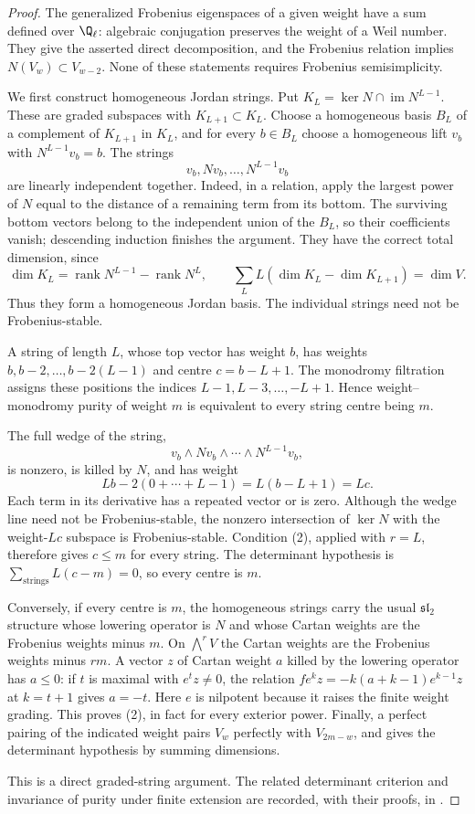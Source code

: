 \begin{proof}
The generalized Frobenius eigenspaces of a given weight have a
sum defined over $\Q_\ell$: algebraic conjugation preserves the
weight of a Weil number.  They give the asserted direct
decomposition, and the Frobenius relation implies
$N(V_w)\subset V_{w-2}$.  None of these statements requires
Frobenius semisimplicity.

We first construct homogeneous Jordan strings.  Put
$K_L=\ker N\cap\operatorname{im}N^{L-1}$.  These are graded
subspaces with $K_{L+1}\subset K_L$.  Choose a homogeneous basis
$B_L$ of a complement of $K_{L+1}$ in $K_L$, and for every
$b\in B_L$ choose a homogeneous lift $v_b$ with
$N^{L-1}v_b=b$.  The strings
\[
 v_b,Nv_b,\ldots,N^{L-1}v_b
\]
are linearly independent together.  Indeed, in a relation,
apply the largest power of $N$ equal to the distance of a
remaining term from its bottom.  The surviving bottom vectors
belong to the independent union of the $B_L$, so their
coefficients vanish; descending induction finishes the argument.
They have the correct total dimension, since
\[
 \dim K_L=\operatorname{rank}N^{L-1}
               -\operatorname{rank}N^L,\qquad
 \sum_L L(\dim K_L-\dim K_{L+1})=\dim V.
\]
Thus they form a homogeneous Jordan basis.  The individual
strings need not be Frobenius-stable.

A string of length $L$, whose top vector has weight $b$, has
weights $b,b-2,\ldots,b-2(L-1)$ and centre $c=b-L+1$.
The monodromy filtration assigns these positions the indices
$L-1,L-3,\ldots,-L+1$.  Hence weight--monodromy purity of
weight $m$ is equivalent to every string centre being $m$.

The full wedge of the string,
\[
 v_b\wedge Nv_b\wedge\cdots\wedge N^{L-1}v_b,
\]
is nonzero, is killed by $N$, and has weight
\[
 Lb-2(0+\cdots+L-1)=L(b-L+1)=Lc.
\]
Each term in its derivative has a repeated vector or is zero.
Although the wedge line need not be Frobenius-stable, the
nonzero intersection of $\ker N$ with the weight-$Lc$ subspace
is Frobenius-stable.  Condition (2), applied with $r=L$, therefore
gives $c\leq m$ for every string.  The determinant hypothesis is
$\sum_{\text{strings}}L(c-m)=0$, so every centre is $m$.

Conversely, if every centre is $m$, the homogeneous strings
carry the usual $\mathfrak{sl}_2$ structure whose lowering
operator is $N$ and whose Cartan weights are the Frobenius
weights minus $m$.  On $\bigwedge^rV$ the Cartan weights are
the Frobenius weights minus $rm$.  A vector $z$ of Cartan
weight $a$ killed by the lowering operator has $a\leq0$:
if $t$ is maximal with $e^tz\ne0$, the relation
$f e^kz=-k(a+k-1)e^{k-1}z$ at $k=t+1$ gives
$a=-t$.  Here $e$ is nilpotent because it raises the finite
weight grading.  This proves (2), in fact for every exterior power.
Finally, a perfect pairing of the indicated weight pairs
$V_w$ perfectly with $V_{2m-w}$, and gives the determinant
hypothesis by summing dimensions.

This is a direct graded-string argument.  The related
determinant criterion and invariance of purity under finite
extension are recorded, with their proofs, in
\citet[Lemma~1.4(1), (2), (5), author pp.~6--7]{c_tayloryoshida2007}.
\end{proof}

